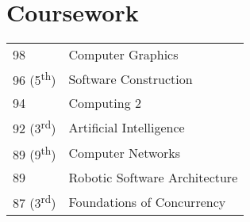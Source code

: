 \documentclass[letter]{deedy-resume} %
\begin{document}
\begin{minipage}[t]{0.33\textwidth}
\sectionspace %


\section{Coursework}

\begin{tabular}{@{}ll}
98 & Computer Graphics \\
96 (5\textsuperscript{th}) & Software Construction \\
94 & Computing 2 \\
92 (3\textsuperscript{rd}) & Artificial Intelligence \\
89 (9\textsuperscript{th}) & Computer Networks \\
89 & Robotic Software Architecture \\
87 (3\textsuperscript{rd}) & Foundations of Concurrency \\
\end{tabular}


\sectionspace %






\end{minipage}
\end{document}
